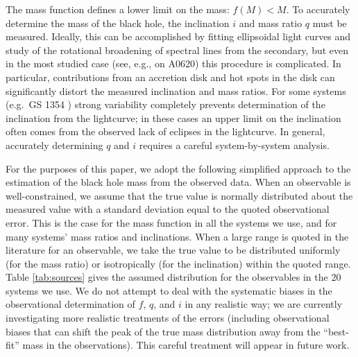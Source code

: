 \documentclass[preprint]{aastex}
\begin{document}
The mass function defines a lower limit on the mass: $f(M) < M$.  To
accurately determine the mass of the black hole, the inclination $i$
and mass ratio $q$ must be measured.  Ideally, this can be
accomplished by fitting ellipsoidal light curves and study of the
rotational broadening of spectral lines from the secondary, but even
in the most studied case (see, e.g., \citet{Cantrell2010} on A0620)
this procedure is complicated.  In particular, contributions from an
accretion disk and hot spots in the disk can significantly distort the
measured inclination and mass ratios.  For some systems (e.g.\ GS 1354
\citep{Casares2009}) strong variability completely prevents
determination of the inclination from the lightcurve; in these cases
an upper limit on the inclination often comes from the observed lack
of eclipses in the lightcurve.  In general, accurately determining $q$
and $i$ requires a careful system-by-system analysis.

For the purposes of this paper, we adopt the following simplified
approach to the estimation of the black hole mass from the observed
data.  When an observable is well-constrained, we assume that the true
value is normally distributed about the measured value with a standard
deviation equal to the quoted observational error.  This is the case
for the mass function in all the systems we use, and for many systems'
mass ratios and inclinations.  When a large range is quoted in the
literature for an observable, we take the true value to be distributed
uniformly (for the mass ratio) or isotropically (for the inclination)
within the quoted range.  Table \ref{tab:sources} gives the assumed
distribution for the observables in the 20 systems we use.  We do not
attempt to deal with the systematic biases in the observational
determination of $f$, $q$, and $i$ in any realistic way; we are
currently investigating more realistic treatments of the errors
(including observational biases that can shift the peak of the true
mass distribution away from the ``best-fit'' mass in the
observations).  This careful treatment will appear in future work.
\end{document}
